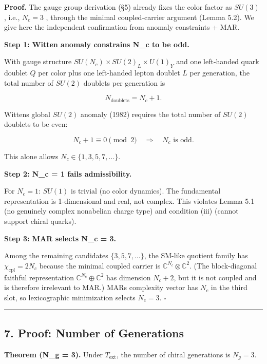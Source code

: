 \textbf{Proof.} The gauge group derivation (§5) already fixes the color factor as \(SU(3)\) , i.e., \(N_c = 3\) , through the minimal coupled-carrier argument (Lemma 5.2). We give here the independent confirmation from anomaly constraints + MAR.

\textbf{Step 1: Witten anomaly constrains N\_c to be odd.}

With gauge structure \(SU(N_c) \times SU(2)_L \times U(1)_Y\) and one left-handed quark doublet \(Q\) per color plus one left-handed lepton doublet \(L\) per generation, the total number of \(SU(2)\) doublets per generation is

\[N_{\mathrm{doublets}} = N_c + 1.\]

Witten\textquotesingle s global \(SU(2)\) anomaly (1982) requires the total number of \(SU(2)\) doublets to be even:

\[N_c + 1 \equiv 0 \pmod{2} \quad \Longrightarrow \quad N_c \text{ is odd}.\]

This alone allows \(N_c \in \{1, 3, 5, 7, \ldots\}\).

\textbf{Step 2: N\_c = 1 fails admissibility.}

For \(N_c = 1\): \(SU(1)\) is trivial (no color dynamics). The fundamental representation is 1-dimensional and real, not complex. This violates Lemma 5.1 (no genuinely complex nonabelian charge type) and condition (iii) (cannot support chiral quarks).

\textbf{Step 3: MAR selects N\_c = 3.}

Among the remaining candidates \(\{3, 5, 7, \ldots\}\), the SM-like quotient family has \(\chi_{\mathrm{cpl}} = 2N_c\) because the minimal coupled carrier is \(\mathbb{C}^{N_c} \otimes \mathbb{C}^2\). (The block-diagonal faithful representation \(\mathbb{C}^{N_c} \oplus \mathbb{C}^2\) has dimension \(N_c + 2\), but it is not coupled and is therefore irrelevant to MAR.) MAR\textquotesingle s complexity vector has \(N_c\) in the third slot, so lexicographic minimization selects \(N_c = 3\). \(\square\)

\begin{center}\rule{0.5\linewidth}{0.5pt}\end{center}

\subsection{7. Proof: Number of Generations}\label{7-proof-number-of-generations}

\textbf{Theorem (N\_g = 3).} Under \(T_{\mathrm{ext}}\), the number of chiral generations is \(N_g = 3\).

